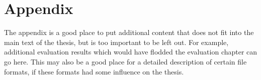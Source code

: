 \chapter{Appendix}

The appendix is a good place to put additional content that does not fit into the main text of the thesis, but is too important to be left out. For example, additional evaluation results which would have flodded the evaluation chapter can go here. This may also be a good place for a detailed description of certain file formats, if these formats had some influence on the thesis.